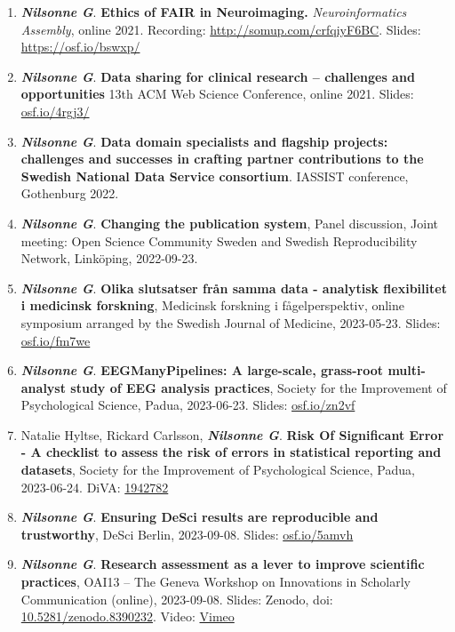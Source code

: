 \documentclass[10pt]{article}
\begin{document}
\begin{enumerate}[nolistsep]
\item \textbf{\textit{Nilsonne G}}. \textbf{Ethics of FAIR in Neuroimaging.} \emph{Neuroinformatics Assembly}, online 2021.  Recording: \href{http://somup.com/crfqiyF6BC}{http://somup.com/crfqiyF6BC}. Slides: \href{https://osf.io/bswxp/ }{https://osf.io/bswxp/}
\item \textbf{\textit{Nilsonne G}}. \textbf{Data sharing for clinical research – challenges and opportunities} 13th ACM Web Science Conference, online 2021.
Slides: \href{https://osf.io/4rgj3/}{osf.io/4rgj3/}
\item \textbf{\textit{Nilsonne G}}. \textbf{Data domain specialists and flagship projects: challenges and successes in crafting partner contributions to the Swedish National Data Service consortium}. IASSIST conference, Gothenburg 2022.
\item \textbf{\textit{Nilsonne G}}. \textbf{Changing the publication system}, Panel discussion, Joint meeting: Open Science Community Sweden and Swedish Reproducibility Network, Linköping, 2022-09-23.
\item \textbf{\textit{Nilsonne G}}. \textbf{Olika slutsatser från samma data - analytisk flexibilitet i medicinsk forskning}, Medicinsk forskning i fågelperspektiv, online symposium arranged by the Swedish Journal of Medicine, 2023-05-23. Slides: \href{https://osf.io/fm7we}{osf.io/fm7we}
\item \textbf{\textit{Nilsonne G}}. \textbf{EEGManyPipelines: A large-scale, grass-root multi-analyst study of EEG analysis practices}, Society for the Improvement of Psychological Science, Padua, 2023-06-23. Slides: \href{https://osf.io/zn2vf}{osf.io/zn2vf}
\item Natalie Hyltse, Rickard Carlsson, \textbf{\textit{Nilsonne G}}. \textbf{Risk Of Significant Error - A checklist to assess the risk of errors in statistical reporting and datasets}, Society for the Improvement of Psychological Science, Padua, 2023-06-24.
DiVA: \href{https://lnu.diva-portal.org/smash/record.jsf?pid=diva2\%3A1942782}{1942782}
\item \textbf{\textit{Nilsonne G}}. \textbf{Ensuring DeSci results are reproducible and trustworthy}, DeSci Berlin, 2023-09-08. Slides: \href{https://osf.io/z5amvh}{osf.io/5amvh}
\item \textbf{\textit{Nilsonne G}}. \textbf{Research assessment as a lever to improve scientific practices}, OAI13 – The Geneva Workshop on Innovations in Scholarly Communication (online), 2023-09-08. Slides: Zenodo, doi: \href{https://zenodo.org/doi/10.5281/zenodo.8390232}{10.5281/zenodo.8390232}. Video: \href{https://vimeo.com/showcase/10628629/video/862484008}{Vimeo}

\end{enumerate}
\end{document}

